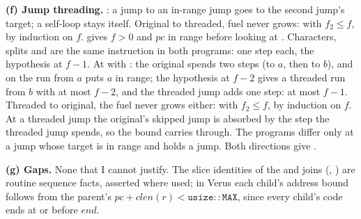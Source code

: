 \documentclass[11pt]{article}
\begin{document}
\begin{answer}
\textbf{(f) Jump threading.} : a jump to an
in-range jump goes to the second jump's target; a self-loop stays itself.
Original to threaded, fuel never grows:
 with $f_2 \le
f$, by induction on $f$.  gives $f > 0$ and $pc$ in range
before looking at . Characters, splits and  are the same
instruction in both programs: one step each, the hypothesis at $f-1$. At
 with : the original spends two steps (to
$a$, then to $b$), and  on the run from $a$ puts $a$ in
range; the hypothesis at $f - 2$ gives a threaded run from $b$ with at most
$f - 2$, and the threaded jump adds one step: at most $f - 1$. Threaded to original, the
fuel never grows either:  with $f_2 \le f$, by induction on $f$. At a threaded jump the
original's skipped jump is absorbed by the step the threaded jump spends, so
the bound carries through. The programs differ only at a jump whose target is
in range and holds a jump. Both directions give
.

\textbf{(g) Gaps.} None that I cannot justify. The slice identities of the
 and  joins (,
) are routine sequence facts, asserted where
used; in Verus each child's address bound follows from the parent's
$pc + \mathit{clen}(r) < \mathtt{usize::MAX}$, since every child's code ends at
or before $\mathit{end}$.
\end{answer}
\end{document}
